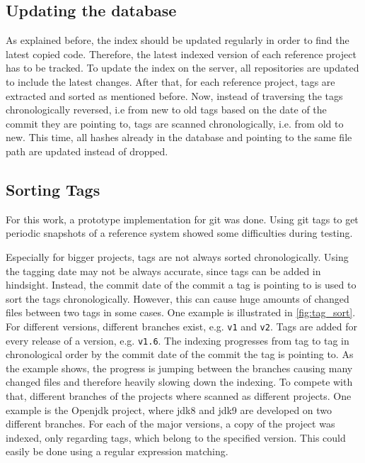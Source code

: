 \subsection{Updating the database}\label{section:implementation/history_analysis/update}
As explained before, the index should be updated regularly in order to find the latest copied code.
Therefore, the latest indexed version of each reference project has to be tracked.
To update the index on the server, all repositories are updated to include the latest changes.
After that, for each reference project, tags are extracted and sorted as mentioned before.
Now, instead of traversing the tags chronologically reversed, i.e from new to old tags based on the date of the commit they are pointing to, tags are scanned chronologically, i.e. from old to new.
This time, all hashes already in the database and pointing to the same file path are updated instead of dropped.

\subsection{Sorting Tags}\label{section:implementation/history_analysis/sorting_tags}
For this work, a prototype implementation for git was done.
Using git tags to get periodic snapshots of a reference system showed some difficulties during testing.

Especially for bigger projects, tags are not always sorted chronologically.
Using the tagging date may not be always accurate, since tags can be added in hindsight.
Instead, the commit date of the commit a tag is pointing to is used to sort the tags chronologically.
However, this can cause huge amounts of changed files between two tags in some cases.
One example is illustrated in \autoref{fig:tag_sort}.
For different versions, different branches exist, e.g. \texttt{v1} and \texttt{v2}.
Tags are added for every release of a version, e.g. \texttt{v1.6}.
The indexing progresses from tag to tag in chronological order by the commit date of the commit the tag is pointing to.
As the example shows, the progress is jumping between the branches causing many changed files and therefore heavily slowing down the indexing.
To compete with that, different branches of the projects where scanned as different projects.
One example is the Openjdk project, where jdk8 and jdk9 are developed on two different branches.
For each of the major versions, a copy of the project was indexed, only regarding tags, which belong to the specified version.
This could easily be done using a regular expression matching.

